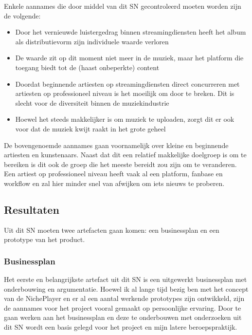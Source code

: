 Enkele aannames die door middel van dit SN gecontroleerd moeten worden zijn de volgende:

\begin{itemize}
    \item Door het vernieuwde luistergedrag binnen streamingdiensten heeft het album als distributievorm zijn individuele waarde verloren
    \item De waarde zit op dit moment niet meer in de muziek, maar het platform die toegang biedt tot de (haast onbeperkte) content
    \item Doordat beginnende artiesten op streamingdiensten direct concurreren met artiesten op professioneel niveau is het moeilijk om door te breken. Dit is slecht voor de diversiteit binnen de muziekindustrie
    \item Hoewel het steeds makkelijker is om muziek te uploaden, zorgt dit er ook voor dat de muziek kwijt raakt in het grote geheel
\end{itemize}

De bovengenoemde aannames gaan voornamelijk over kleine en beginnende artiesten en kunstenaars. Naast dat dit een relatief makkelijke doelgroep is om te bereiken is dit ook de groep die het meeste bereidt zou zijn om te veranderen. Een artiest op professioneel niveau heeft vaak al een platform, fanbase en workflow en zal hier minder snel van afwijken om iets nieuws te proberen.

\subsection{Resultaten}
Uit dit SN moeten twee artefacten gaan komen: een businessplan en een prototype van het product.

\subsubsection*{Businessplan}
Het eerste en belangrijkste artefact uit dit SN is een uitgewerkt businessplan met onderbouwing en argumentatie. Hoewel ik al lange tijd bezig ben met het concept van de NichePlayer en er al een aantal werkende prototypes zijn ontwikkeld, zijn de aannames voor het project vooral gemaakt op persoonlijke ervaring. Door te gaan werken aan het businessplan en deze te onderbouwen met onderzoeken uit dit SN wordt een basis gelegd voor het project en mijn latere beroepspraktijk.

